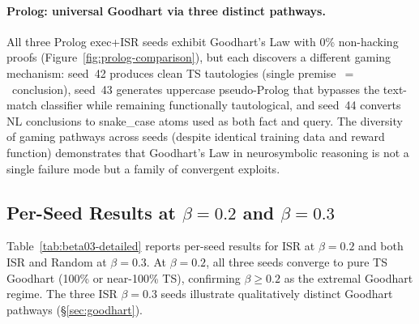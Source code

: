 \paragraph{Prolog: universal Goodhart via three distinct pathways.}
All three Prolog exec+ISR seeds exhibit Goodhart's Law with 0\% non-hacking proofs (Figure~\ref{fig:prolog-comparison}), but each discovers a different gaming mechanism:
seed~42 produces clean TS tautologies (single premise~$=$~conclusion),
seed~43 generates uppercase pseudo-Prolog that bypasses the text-match classifier while remaining functionally tautological,
and seed~44 converts NL conclusions to snake\_case atoms used as both fact and query.
The diversity of gaming pathways across seeds (despite identical training data and reward function) demonstrates that Goodhart's Law in neurosymbolic reasoning is not a single failure mode but a family of convergent exploits.

\subsection{Per-Seed Results at $\beta{=}0.2$ and $\beta{=}0.3$}
\label{app:beta03}

Table~\ref{tab:beta03-detailed} reports per-seed results for ISR at $\beta{=}0.2$ and both ISR and Random at $\beta{=}0.3$.
At $\beta{=}0.2$, all three seeds converge to pure TS Goodhart (100\% or near-100\% TS), confirming $\beta{\geq}0.2$ as the extremal Goodhart regime.
The three ISR $\beta{=}0.3$ seeds illustrate qualitatively distinct Goodhart pathways (\S\ref{sec:goodhart}).

